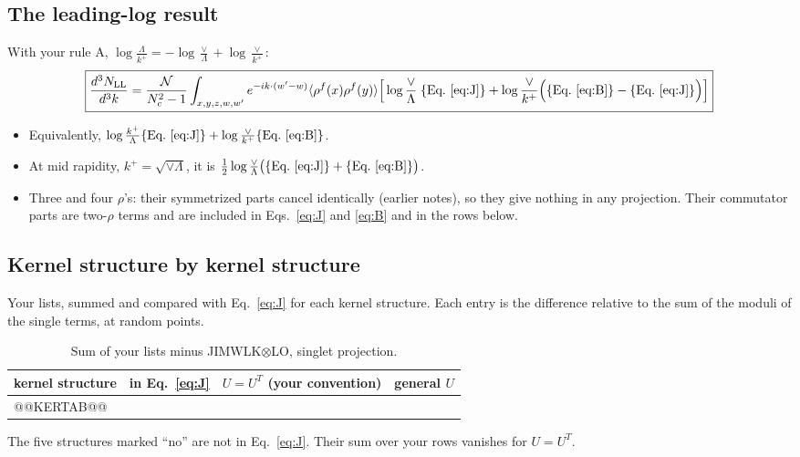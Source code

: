 \documentclass[10pt]{article}
\numberwithin{equation}{section}
\newcommand{\NN}{\mathcal N}
\begin{document}
\subsection{The leading-log result}
With your rule A, $\log\frac{\Lambda}{k^+}=-\log\frac\vee\Lambda+\log\frac{\vee}{k^+}$:
\begin{equation}
\boxed{\frac{d^3N_{\rm LL}}{d^3k}=\frac{\NN}{N_c^2-1}\int_{x,y,z,w,w'}e^{-ik\cdot(w'-w)}\langle\rho^f(x)\rho^f(y)\rangle\Big[\log\frac{\vee}{\Lambda}\;\{\text{Eq.~\eqref{eq:J}}\}+\log\frac{\vee}{k^+}\Big(\{\text{Eq.~\eqref{eq:B}}\}-\{\text{Eq.~\eqref{eq:J}}\}\Big)\Big]}
\label{eq:LL}
\end{equation}
\begin{itemize}
\item Equivalently, $\log\frac{k^+}{\Lambda}\{\text{Eq.~\eqref{eq:J}}\}+\log\frac{\vee}{k^+}\{\text{Eq.~\eqref{eq:B}}\}$.
\item At mid rapidity, $k^+=\sqrt{\vee\Lambda}$, it is $\frac12\log\frac{\vee}{\Lambda}\big(\{\text{Eq.~\eqref{eq:J}}\}+\{\text{Eq.~\eqref{eq:B}}\}\big)$.
\item Three and four $\rho$'s: their symmetrized parts cancel identically (earlier notes), so they give nothing in any projection. Their commutator parts are two-$\rho$ terms and are included in Eqs.~\eqref{eq:J} and \eqref{eq:B} and in the rows below.
\end{itemize}

\subsection{Kernel structure by kernel structure}
Your lists, summed and compared with Eq.~\eqref{eq:J} for each kernel structure. Each entry is the difference relative to the sum of the moduli of the single terms, at random points.
\begin{table}[H]\centering\small
\caption{Sum of your lists minus JIMWLK$\otimes$LO, singlet projection.}\label{tab:kernels}
\begin{tabular}{@{}lccc@{}}\toprule
kernel structure & in Eq.~\eqref{eq:J} & $U=U^T$ (your convention) & general $U$\\\midrule
@@KERTAB@@
\bottomrule
\end{tabular}
\end{table}
The five structures marked ``no'' are not in Eq.~\eqref{eq:J}. Their sum over your rows vanishes for $U=U^T$.

\end{document}
